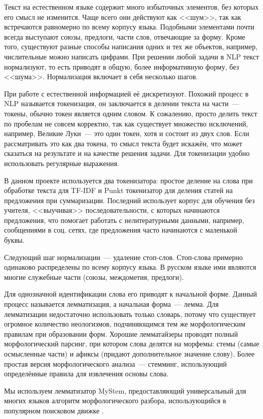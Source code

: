 \documentclass[a4paper, 14pt]{extarticle}
\begin{document}
Текст на естественном языке содержит много избыточных элементов, без которых его смысл не изменится. Чаще всего они действуют как <<шум>>, так как встречаются равномерно по всему корпусу языка. Подобными элементами почти всегда выступают союзы, предлоги, части слов, отвечающие за форму. Кроме того, существуют разные способы написания одних и тех же объектов, например, числительные можно написать цифрами. При решении любой задачи в NLP текст нормализуют, то есть приводят в общую, более информативную форму, без <<шума>>. Нормализация включает в себя несколько шагов.

При работе с естественной информацией её дискретизуют. Похожий процесс в NLP называется токенизация, он заключается в делении текста на части~--- токены, обычно токен является одним словом. К сожалению, просто делить текст по пробелам не совсем корректно, так как существует множество исключений, например, Великие Луки~--- это один токен, хотя и состоит из двух слов. Если рассматривать это как два токена, то смысл текста будет искажён, что может сказаться на результате и на качестве решения задачи. Для токенизации удобно использовать регулярные выражения.

В данном проекте используется два токенизатора: простое деление на слова при обработке текста для TF-IDF и Punkt токенизатор для деления статей на предложения при суммаризации. Последний использует корпус для обучения без учителя, <<выучивая>> последовательности, с которых начинаются предложения, что помогает работать с нелитературными данными, например, сообщениями в соц. сетях, где предложения часто начинаются с маленькой буквы.

Следующий шаг нормализации~--- удаление стоп-слов. Стоп-слова примерно одинаково распределены по всему корпусу языка. В русском языке ими являются многие служебные части (союзы, междометия, предлоги).

Для однозначной идентификации слова его приводят к начальной форме. Данный процесс называется лемматизация, а начальная форма~--- лемма. Для лемматизации недостаточно использовать только словарь, потому что существует огромное количество неологизмов, подчиняющимся тем же морфологическим правилам при образовании форм. Хорошие лемматайзеры проводят полный морфологический парсинг, при котором слова делятся на морфемы: стемы (самые осмысленные части) и афиксы (придают дополнительное значение слову). Более простая версия морфологического анализа~--- стемминг, использующий определённые правила для извлечения основы слова.

Мы используем лемматизатор MyStem, предоставляющий универсальный для многих языков алгоритм морфологического разбора, использующийся в популярном поисковом движке \cite{pystem}.
\end{document}
